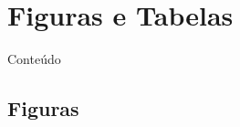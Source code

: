 \documentclass[xcolor=table]{beamer}
\begin{document}
\section{Figuras e Tabelas}

\begin{frame}{Conteúdo}
\begin{multicols}{2}
\tableofcontents[currentsection]
\end{multicols}
\end{frame}

\subsection{Figuras}
\end{document}
